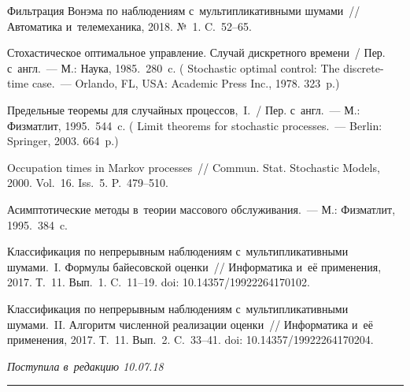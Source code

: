 \begin{multicols}{2}
{{\begin{thebibliography}{99}
 Фильтрация Вонэма по наблюдениям с~мультипликативными шумами~// 
Автоматика и~телемеханика, 2018.
№~1. C.~52--65. 
 
 Стохастическое оптимальное управление. 
Случай дискретного времени~/ Пер. с~англ.~--- М.: Наука, 1985.~280~c.
( Stochastic optimal control:
The discrete-time case.~--- Orlando, FL, USA:
Academic Press Inc., 1978. 323~p.)

 Предельные теоремы для случайных процессов,~I.~/
Пер. с~англ.~--- 
М.: Физматлит, 1995.~544~c.
( Limit theorems for stochastic processes.~---
Berlin: Springer, 2003. 664~p.)

 Occupation times in Markov processes~//
Commun. Stat. Stochastic Models, 2000. Vol.~16. Iss.~5. P.~479--510. 

 Асимптотические методы в~тео\-рии массового обслуживания.~--- 
М.: Физматлит, 1995.~384~c.

 Классификация по непрерывным наблюдениям с~мультипликативными шумами.~I. 
Формулы байесовской оценки~// Информатика и~её применения, 2017. Т.~11. Вып.~1. C.~11--19.
doi: 10.14357/19922264170102.

 Классификация по непрерывным наблюдениям с~мультипликативными 
шумами.~II. Алгоритм численной реализации оценки~// Информатика и~её 
применения, 2017. Т.~11. Вып.~2. C.~33--41.
doi: 10.14357/19922264170204.

 \end{thebibliography}

 }
 }

\end{multicols}

\vspace*{-4pt}

\hfill{\small\textit{Поступила в~редакцию 10.07.18}}

\vspace*{6pt}




\hrule

\vspace*{2pt}

